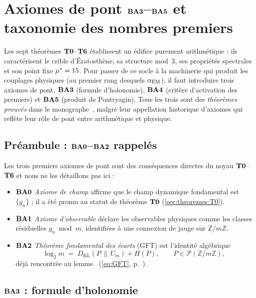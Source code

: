 \section{Axiomes de pont \texorpdfstring{$\textbf{BA3}$--$\textbf{BA5}$}{BA3-BA5} et taxonomie des nombres premiers}
\label{sec:bridge}

Les sept théorèmes $\textbf{T0}$--$\textbf{T6}$ établissent un édifice purement arithmétique : ils caractérisent le crible d'Ératosthène, sa structure mod~$3$, ses propriétés spectrales et son point fixe $\mu^{*} = 15$. Pour passer de ce socle à la machinerie qui produit les couplages physiques (au premier rang desquels $\alpha_{\rm EM}$), il faut introduire trois axiomes de pont, $\textbf{BA3}$ (formule d'holonomie), $\textbf{BA4}$ (critère d'activation des premiers) et $\textbf{BA5}$ (produit de Pontryagin). Tous les trois sont des \emph{théorèmes prouvés} dans le monographe~\cite[ch.~06, ch.~09]{PT_Monograph}, malgré leur appellation historique d'\og axiomes \fg{} qui reflète leur rôle de pont entre arithmétique et physique.

\subsection{Préambule : $\textbf{BA0}$--$\textbf{BA2}$ rappelés}
\label{sec:bridge:BA012}

Les trois premiers axiomes de pont sont des conséquences directes du noyau $\textbf{T0}$--$\textbf{T6}$ et nous ne les détaillons pas ici :
\begin{itemize}[nosep,leftmargin=*]
\item $\textbf{BA0}$ \emph{Axiome de champ} affirme que le champ dynamique fondamental est $\{g_n\}$ ; il a été promu au statut de théorème $\textbf{T0}$ (\ref{sec:theoremes:T0}).
\item $\textbf{BA1}$ \emph{Axiome d'observable} déclare les observables physiques comme les classes résiduelles $g_n \bmod m$, identifiées à une connexion de jauge sur $\mathbb{Z}/m\mathbb{Z}$.
\item $\textbf{BA2}$ \emph{Théorème fondamental des écarts} (GFT) est l'identité algébrique
\[
\log_2 m \;=\; D_{\mathrm{KL}}\!\left(P \,\|\, U_m\right) + H(P), \qquad P \in \mathcal{P}(\mathbb{Z}/m\mathbb{Z}),
\]
déjà rencontrée au lemme~\Lzero{} (\eqref{eq:GFT}, p.~\pageref{eq:GFT}).
\end{itemize}

\subsection{\texorpdfstring{$\textbf{BA3}$}{BA3} : formule d'holonomie}
\label{sec:bridge:BA3}

